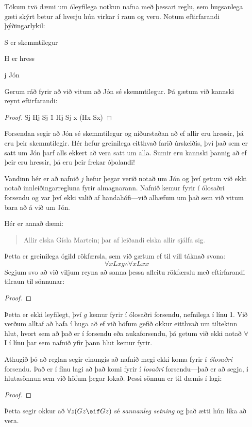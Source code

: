 Tökum tvö dæmi um óleyfilega notkun nafna með þessari reglu, sem hugsanlega gæti skýrt betur af hverju hún virkar í raun og veru. Notum eftirfarandi þýðingarlykil: 	
	\begin{ekey}
		\item[S]  er skemmtilegur
		\item[H]  er hress
		\item[j] Jón
	\end{ekey}
Gerum ráð fyrir að við vitum að Jón sé skemmtilegur. Þá gætum við kannski reynt eftirfarandi:
\begin{proof}
 {Sj}
\open
{} {Hj}
 {Sj} \r{1}
\close
{} {Hj \eif Sj} 
 {\forall x (Hx \eif Sx)} 
\end{proof}
Forsendan segir að Jón sé skemmtilegur og niðurstaðan að ef allir eru hressir, þá eru þeir skemmtilegir. Hér hefur greinilega eitthvað farið úrskeiðis, því það sem er satt um Jón þarf alls ekkert að vera satt um alla. Sumir eru kannski þannig að ef þeir eru hressir, þá eru þeir frekar óþolandi!

Vandinn hér er að nafnið $j$ hefur þegar verið notað um Jón og því getum við ekki notað innleiðingarregluna fyrir almagnarann. Nafnið kemur fyrir í ólosaðri forsendu og var því ekki valið af handahófi---við alhæfum um það sem við vitum bara að á við um Jón.

Hér er annað dæmi:
	\begin{quote}
		Allir elska Gísla Martein; þar af leiðandi elska allir sjálfa sig.
	\end{quote}
Þetta er greinilega ógild rökfærsla, sem við gætum ef til vill táknað svona:	
$$\forall x Lxg \therefore \forall x Lxx$$
Segjum svo að við viljum reyna að sanna þessa afleitu rökfærslu með eftirfarandi tilraun til sönnunar:
\begin{proof}
	 
	 
\end{proof}\noindent
Þetta er ekki leyfilegt, því $g$ kemur fyrir í ólosaðri forsendu, nefnilega í línu 1. Við verðum alltaf að hafa í huga að ef við höfum gefið okkur eitthvað um tiltekinn hlut, hvort sem að það er í forsendu eða aukaforsendu, þá getum við ekki notað $\forall$I í línu þar sem nafnið yfir þann hlut kemur fyrir.

Athugið þó að reglan segir einungis að nafnið megi ekki koma fyrir í \emph{ólosaðri} forsendu. Það er í fínu lagi að það komi fyrir í \emph{losaðri} forsendu---það er að segja, í hlutasönnun sem við höfum þegar lokað. Þessi sönnun er til dæmis í lagi:
\begin{proof}
	\open
	\close
\end{proof}
Þetta segir okkur að $\forall z (Gz \eif Gz)$ sé \emph{sannanleg setning} og það ætti hún líka að vera.

